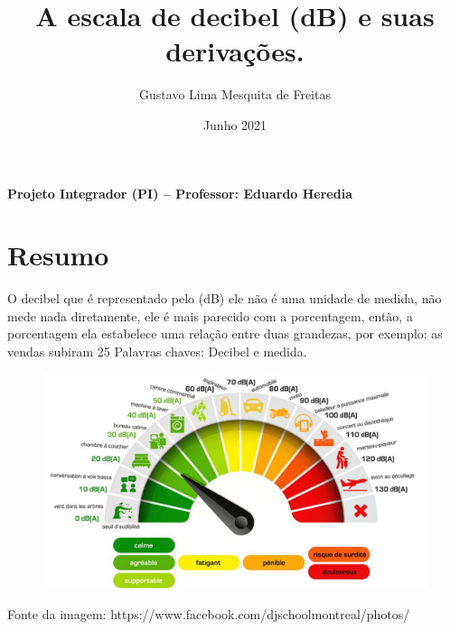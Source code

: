 \documentclass{article}
\title{A escala de decibel (dB) e suas derivações.}
\author{Gustavo Lima Mesquita de Freitas}
\date{Junho 2021}
\begin{document}
\maketitle

\textbf{ Projeto Integrador (PI) – Professor: Eduardo Heredia }
\
\section{Resumo}
	O decibel que é representado pelo (dB) ele não é uma unidade de medida, não mede nada diretamente, ele é mais parecido com a porcentagem, então, a porcentagem ela estabelece uma relação entre duas grandezas, por exemplo: as vendas subiram 25%
	Palavras chaves: Decibel e medida.
	\newline
	
	\begin{figure}[h]
    \centering
    \includegraphics[width = 14cm]{imagem.jpg}
    \label{fig:my_label}
    \end{figure}
	
	Fonte da imagem: https://www.facebook.com/djschoolmontreal/photos/%
	
\end{document}
